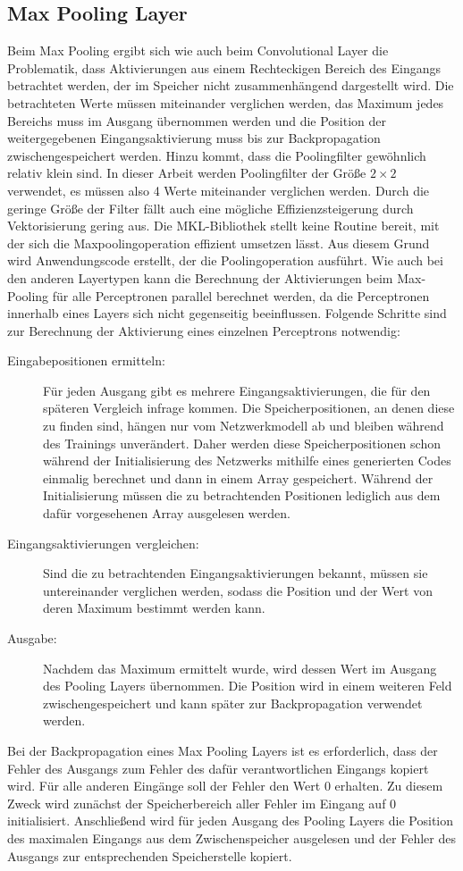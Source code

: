 \documentclass[../main.tex]{subfiles}
\begin{document}
\subsection{Max Pooling Layer}
Beim Max Pooling ergibt sich wie auch beim Convolutional Layer die Problematik, dass Aktivierungen aus einem Rechteckigen Bereich des Eingangs betrachtet werden, der im Speicher nicht zusammenhängend dargestellt wird. Die betrachteten Werte müssen miteinander verglichen werden, das Maximum jedes Bereichs muss im Ausgang übernommen werden und die Position der weitergegebenen Eingangsaktivierung muss bis zur Backpropagation zwischengespeichert werden. Hinzu kommt, dass die Poolingfilter gewöhnlich relativ klein sind. In dieser Arbeit werden Poolingfilter der Größe \(2\times2\) verwendet, es müssen also 4 Werte miteinander verglichen werden. Durch die geringe Größe der Filter fällt auch eine mögliche Effizienzsteigerung durch Vektorisierung gering aus. Die MKL-Bibliothek stellt keine Routine bereit, mit der sich die Maxpoolingoperation effizient umsetzen lässt. Aus diesem Grund wird Anwendungscode erstellt, der die Poolingoperation ausführt. Wie auch bei den anderen Layertypen kann die Berechnung der Aktivierungen beim Max-Pooling für alle Perceptronen parallel berechnet werden, da die Perceptronen innerhalb eines Layers sich nicht gegenseitig beeinflussen. Folgende Schritte sind zur Berechnung der Aktivierung eines einzelnen Perceptrons notwendig: 
\begin{description}
\item[Eingabepositionen ermitteln:] Für jeden Ausgang gibt es mehrere Eingangsaktivierungen, die für den späteren Vergleich infrage kommen. Die Speicherpositionen, an denen diese zu finden sind, hängen nur vom Netzwerkmodell ab und bleiben während des Trainings unverändert. Daher werden diese Speicherpositionen schon während der Initialisierung des Netzwerks mithilfe eines generierten Codes einmalig berechnet und dann in einem Array gespeichert. Während der Initialisierung müssen die zu betrachtenden Positionen lediglich aus dem dafür vorgesehenen Array ausgelesen werden. 
\item[Eingangsaktivierungen vergleichen:] Sind die zu betrachtenden Eingangsaktivierungen bekannt, müssen sie untereinander verglichen werden, sodass die Position und der Wert von deren Maximum bestimmt werden kann. 
\item[Ausgabe:] Nachdem das Maximum ermittelt wurde, wird dessen Wert im Ausgang des Pooling Layers übernommen. Die Position wird in einem weiteren Feld zwischengespeichert und kann später zur Backpropagation verwendet werden. 
\end{description}
Bei der Backpropagation eines Max Pooling Layers ist es erforderlich, dass der Fehler des Ausgangs zum Fehler des dafür verantwortlichen Eingangs kopiert wird. Für alle anderen Eingänge soll der Fehler den Wert 0 erhalten. Zu diesem Zweck wird zunächst der Speicherbereich aller Fehler im Eingang auf 0 initialisiert. Anschließend wird für jeden Ausgang des Pooling Layers die Position des maximalen Eingangs aus dem Zwischenspeicher ausgelesen und der Fehler des Ausgangs zur entsprechenden Speicherstelle kopiert. 
\end{document}
